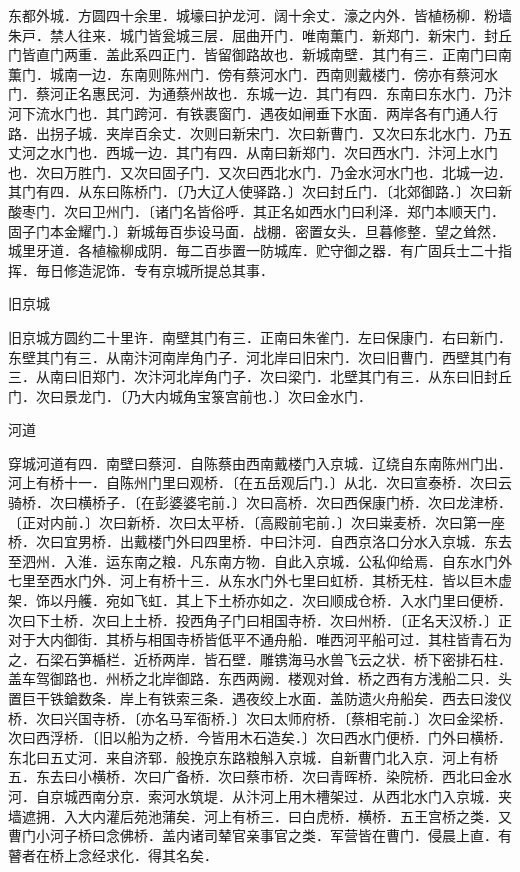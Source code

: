 \documentclass[]{article}
\begin{document}
东都外城．方圆四十余里．城壕曰护龙河．阔十余丈．濠之内外．皆植杨柳．粉墙朱戸．禁人往来．城门皆瓮城三层．屈曲开门．唯南薫门．新郑门．新宋门．封丘门皆直门两重．盖此系四正门．皆留御路故也．新城南壁．其门有三．正南门曰南薫门．城南一边．东南则陈州门．傍有蔡河水门．西南则戴楼门．傍亦有蔡河水门．蔡河正名惠民河．为通蔡州故也．东城一边．其门有四．东南曰东水门．乃汴河下流水门也．其门跨河．有铁裹窗门．遇夜如闸垂下水面．两岸各有门通人行路．出拐子城．夹岸百余丈．次则曰新宋门．次曰新曹门．又次曰东北水门．乃五丈河之水门也．西城一边．其门有四．从南曰新郑门．次曰西水门．汴河上水门也．次曰万胜门．又次曰固子门．又次曰西北水门．乃金水河水门也．北城一边．其门有四．从东曰陈桥门．〔乃大辽人使驿路．〕次曰封丘门．〔北郊御路．〕次曰新酸枣门．次曰卫州门．〔诸门名皆俗呼．其正名如西水门曰利泽．郑门本顺天门．固子门本金耀门．〕新城毎百歩设马面．战棚．密置女头．旦暮修整．望之耸然．城里牙道．各植楡柳成阴．毎二百歩置一防城库．贮守御之器．有广固兵士二十指挥．毎日修造泥饰．专有京城所提总其事．

旧京城

旧京城方圆约二十里许．南壁其门有三．正南曰朱雀门．左曰保康门．右曰新门．东壁其门有三．从南汴河南岸角门子．河北岸曰旧宋门．次曰旧曹门．西壁其门有三．从南曰旧郑门．次汴河北岸角门子．次曰梁门．北壁其门有三．从东曰旧封丘门．次曰景龙门．〔乃大内城角宝箓宫前也．〕次曰金水门．

河道

穿城河道有四．南壁曰蔡河．自陈蔡由西南戴楼门入京城．辽绕自东南陈州门出．河上有桥十一．自陈州门里曰观桥．〔在五岳观后门．〕从北．次曰宣泰桥．次曰云骑桥．次曰横桥子．〔在彭婆婆宅前．〕次曰高桥．次曰西保康门桥．次曰龙津桥．〔正对内前．〕次曰新桥．次曰太平桥．〔高殿前宅前．〕次曰粜麦桥．次曰第一座桥．次曰宜男桥．出戴楼门外曰四里桥．中曰汴河．自西京洛口分水入京城．东去至泗州．入淮．运东南之粮．凡东南方物．自此入京城．公私仰给焉．自东水门外七里至西水门外．河上有桥十三．从东水门外七里曰虹桥．其桥无柱．皆以巨木虚架．饰以丹艧．宛如飞虹．其上下土桥亦如之．次曰顺成仓桥．入水门里曰便桥．次曰下土桥．次曰上土桥．投西角子门曰相国寺桥．次曰州桥．〔正名天汉桥．〕正对于大内御街．其桥与相国寺桥皆低平不通舟船．唯西河平船可过．其柱皆青石为之．石梁石笋楯栏．近桥两岸．皆石壁．雕镌海马水兽飞云之状．桥下密排石柱．盖车驾御路也．州桥之北岸御路．东西两阙．楼观对耸．桥之西有方浅船二只．头置巨干铁鎗数条．岸上有铁索三条．遇夜绞上水面．盖防遗火舟船矣．西去曰浚仪桥．次曰兴国寺桥．〔亦名马军衙桥．〕次曰太师府桥．〔蔡相宅前．〕次曰金梁桥．次曰西浮桥．〔旧以船为之桥．今皆用木石造矣．〕次曰西水门便桥．门外曰横桥．东北曰五丈河．来自济郓．般挽京东路粮斛入京城．自新曹门北入京．河上有桥五．东去曰小横桥．次曰广备桥．次曰蔡市桥．次曰青晖桥．染院桥．西北曰金水河．自京城西南分京．索河水筑堤．从汴河上用木槽架过．从西北水门入京城．夹墙遮拥．入大内灌后苑池蒲矣．河上有桥三．曰白虎桥．横桥．五王宫桥之类．又曹门小河子桥曰念佛桥．盖内诸司辇官亲事官之类．军营皆在曹门．侵晨上直．有瞽者在桥上念经求化．得其名矣．
\end{document}

